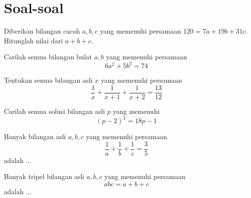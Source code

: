 \documentclass[11pt]{scrartcl}
\begin{document}

\section{Soal-soal}
    \begin{problem}
        Diberikan bilangan cacah $a, b, c$ yang memenuhi persamaan $120 = 7a + 19b + 31c$. Hitunglah nilai dari $a + b + c$.
    \end{problem}

    \begin{problem}
        Carilah semua bilangan bulat $a, b$ yang memenuhi persamaan \[6a^2 + 5b^2 = 74\]
    \end{problem}
    
    \begin{problem}
        Tentukan semua bilangan asli $x$ yang memenuhi persamaan \[\dfrac{1}{x} + \dfrac{1}{x + 1} + \dfrac{1}{x + 2} = \dfrac{13}{12}\]  
    \end{problem}

    \begin{problem}
        Carilah semua solusi bilangan asli $p$ yang memenuhi \[(p-2)^3 = 18p-1\]
    \end{problem}

    \begin{problem}
        Banyak bilangan asli $a, b, c$ yang memenuhi persamaan \[\dfrac{1}{a} + \dfrac{1}{b} + \dfrac{1}{c} = \dfrac{3}{5}\] adalah ...
    \end{problem}


    \begin{problem}
        Banyak tripel bilangan asli $a, b, c$ yang memenuhi persamaan \[abc = a + b + c\] adalah ...
    \end{problem}
\end{document}
